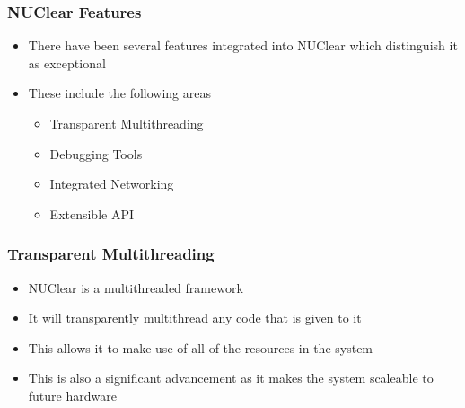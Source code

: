 \documentclass{beamer}
\begin{document}
\begin{frame}
	\frametitle{NUClear Features}
	\begin{itemize}
		\item There have been several features integrated into NUClear which distinguish it as exceptional
		\item These include the following areas
		\begin{itemize}
			\item Transparent Multithreading
			\item Debugging Tools
			\item Integrated Networking
			\item Extensible API
		\end{itemize}
	\end{itemize}
\end{frame}

\begin{frame}
	\frametitle{Transparent Multithreading}
	\begin{itemize}
		\item NUClear is a multithreaded framework
		\item It will transparently multithread any code that is given to it
		\item This allows it to make use of all of the resources in the system
		\item This is also a significant advancement as it makes the system scaleable to future hardware
	\end{itemize}
\end{frame}
\end{document}
